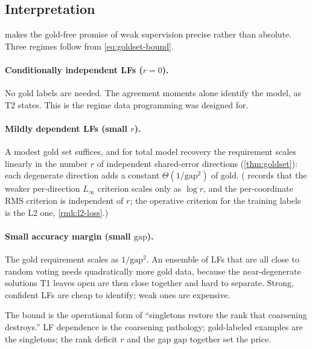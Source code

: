 \subsection{Interpretation}

 makes the gold-free promise of weak supervision
precise rather than absolute. Three regimes follow from
\eqref{eq:goldset-bound}.

\paragraph{Conditionally independent LFs ($r = 0$).} No gold labels
are needed. The agreement moments alone identify the model, as T2
states. This is the regime data programming was designed for.

\paragraph{Mildly dependent LFs (small $r$).} A modest gold set
suffices, and for total model recovery the requirement scales linearly
in the number $r$ of independent shared-error directions
(\cref{thm:goldset}): each degenerate direction adds a constant
$\Theta(1/\mathrm{gap}^2)$ of gold. ( records
that the weaker per-direction $L_\infty$ criterion scales only as
$\log r$, and the per-coordinate RMS criterion is independent of $r$;
the operative criterion for the training labels is the L2 one,
\cref{rmk:l2-loss}.)

\paragraph{Small accuracy margin (small $\mathrm{gap}$).} The gold
requirement scales as $1/\mathrm{gap}^2$. An ensemble of LFs that are
all close to random voting needs quadratically more gold data,
because the near-degenerate solutions T1 leaves open are then close
together and hard to separate. Strong, confident LFs are cheap to
identify; weak ones are expensive.

The bound is the operational form of ``singletons restore the rank
that coarsening destroys.'' LF dependence is the coarsening pathology;
gold-labeled examples are the singletons; the rank deficit $r$ and
the gap $\mathrm{gap}$ together set the price.

